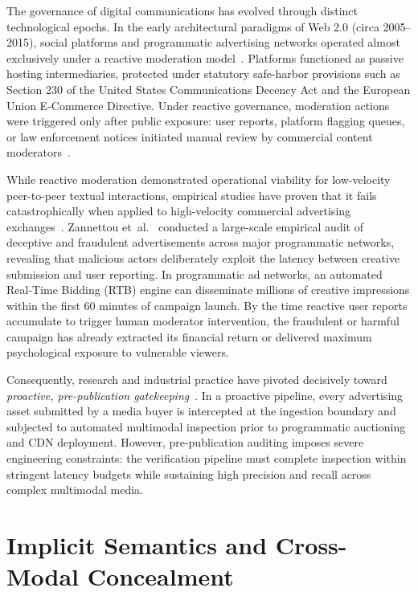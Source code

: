 \documentclass[12pt,a4paper]{report}
\begin{document}
The governance of digital communications has evolved through distinct technological epochs. In the early architectural paradigms of Web 2.0 (circa 2005--2015), social platforms and programmatic advertising networks operated almost exclusively under a reactive moderation model~\cite{gillespie2018custodians,roberts2019behind}. Platforms functioned as passive hosting intermediaries, protected under statutory safe-harbor provisions such as Section 230 of the United States Communications Decency Act and the European Union E-Commerce Directive. Under reactive governance, moderation actions were triggered only after public exposure: user reports, platform flagging queues, or law enforcement notices initiated manual review by commercial content moderators~\cite{roberts2019behind}.

While reactive moderation demonstrated operational viability for low-velocity peer-to-peer textual interactions, empirical studies have proven that it fails catastrophically when applied to high-velocity commercial advertising exchanges~\cite{silva2020pre,zannettou2021characterizing}. Zannettou et~al.~\cite{zannettou2021characterizing} conducted a large-scale empirical audit of deceptive and fraudulent advertisements across major programmatic networks, revealing that malicious actors deliberately exploit the latency between creative submission and user reporting. In programmatic ad networks, an automated Real-Time Bidding (RTB) engine can disseminate millions of creative impressions within the first 60 minutes of campaign launch. By the time reactive user reports accumulate to trigger human moderator intervention, the fraudulent or harmful campaign has already extracted its financial return or delivered maximum psychological exposure to vulnerable viewers.

Consequently, research and industrial practice have pivoted decisively toward \emph{proactive, pre-publication gatekeeping}~\cite{blmguard2026,silva2020pre}. In a proactive pipeline, every advertising asset submitted by a media buyer is intercepted at the ingestion boundary and subjected to automated multimodal inspection prior to programmatic auctioning and CDN deployment. However, pre-publication auditing imposes severe engineering constraints: the verification pipeline must complete inspection within stringent latency budgets while sustaining high precision and recall across complex multimodal media.

\section{Implicit Semantics and Cross-Modal Concealment}
\end{document}
